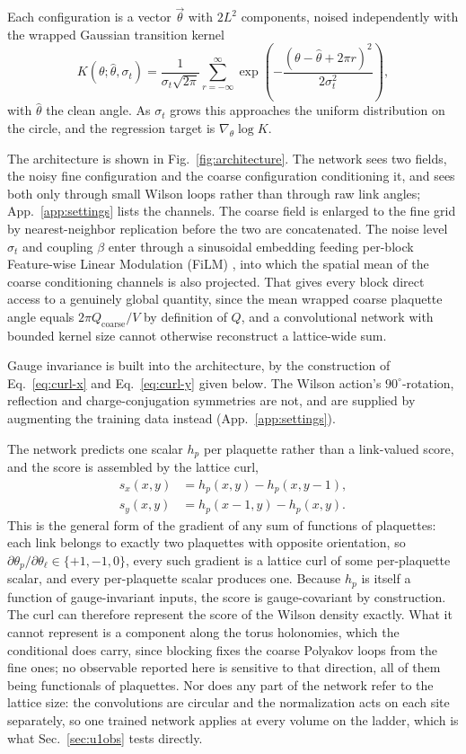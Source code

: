 \documentclass[prd, twocolumn, superscriptaddress, nofootinbib,floatfix]{revtex4-2}
\DeclareRobustCommand{\Eq}[1]{Eq.~\eqref{eq:#1}}
\DeclareRobustCommand{\fig}[1]{Fig.~\ref{fig:#1}}
\DeclareRobustCommand{\app}[1]{App.~\ref{app:#1}}
\DeclareRobustCommand{\sect}[1]{Sec.~\ref{sec:#1}}
\begin{document}
Each configuration is a vector $\vec\theta$ with $2L^2$ components, noised
independently with the wrapped Gaussian transition kernel
\begin{equation}
    K(\theta;\hat\theta,\sigma_t)=\frac{1}{\sigma_t\sqrt{2\pi}}
      \sum_{r=-\infty}^{\infty}
      \exp\!\left(-\frac{(\theta-\hat{\theta} + 2\pi r)^2}{2\sigma_t^2}\right),
    \label{eq:wrapped-kernel}
\end{equation}
with $\hat\theta$ the clean angle. As $\sigma_t$ grows this approaches the uniform
distribution on the circle, and the regression target is $\nabla_\theta\log K$.

The architecture is shown in \fig{architecture}. The network sees two fields,
the noisy fine configuration and the coarse configuration conditioning it, and
sees both only through small Wilson loops rather than through raw link angles;
\app{settings} lists the channels. The coarse field is enlarged to the fine grid
by nearest-neighbor replication before the two are concatenated. The noise level $\sigma_t$ and
coupling $\beta$ enter through a sinusoidal embedding feeding per-block
Feature-wise Linear Modulation (FiLM) \cite{perez2018}, into which the
spatial mean of the coarse conditioning channels is also projected. That gives
every block direct access to a genuinely global quantity, since the mean wrapped
coarse plaquette angle equals $2\pi Q_{\mathrm{coarse}}/V$ by definition
of $Q$, and a convolutional network with bounded kernel size cannot otherwise
reconstruct a lattice-wide sum.

Gauge invariance is built into the architecture, by the construction of
\Eq{curl-x} and \Eq{curl-y} given below. The Wilson action's
$90^\circ$-rotation, reflection and charge-conjugation symmetries are not, and
are supplied by augmenting the training data instead (\app{settings}).

The network predicts one scalar $h_p$ per plaquette rather than a link-valued
score, and the score is assembled by the lattice curl,
\begin{align}
  s_x(x,y) &= h_p(x,y) - h_p(x,y-1), \label{eq:curl-x}\\
  s_y(x,y) &= h_p(x-1,y) - h_p(x,y). \label{eq:curl-y}
\end{align}
This is the general form of the gradient of any sum of functions of plaquettes:
each link belongs to exactly two plaquettes with opposite orientation, so
$\partial\theta_p/\partial\theta_\ell\in\{+1,-1,0\}$, every such gradient is a
lattice curl of some per-plaquette scalar, and every per-plaquette scalar
produces one. Because $h_p$ is itself a function of gauge-invariant inputs, the
score is gauge-covariant by construction. The curl can therefore represent the
score of the Wilson density exactly. What it cannot represent is a component
along the torus holonomies, which the conditional does carry, since blocking
fixes the coarse Polyakov loops from the fine ones; no observable reported here
is sensitive to that direction, all of them being functionals of plaquettes. Nor does any part of the network refer to the
lattice size: the convolutions are circular and the normalization acts on each
site separately, so one trained network applies at every volume on the ladder,
which is what \sect{u1obs} tests directly.
\end{document}
